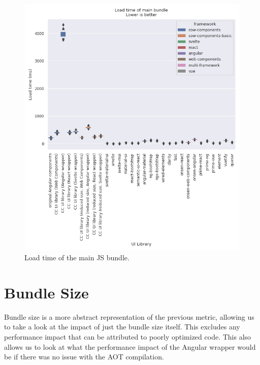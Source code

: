 \begin{figure}[htbp]
  \includegraphics[width=\columnwidth]{plots/load-time-all.png}
  \caption{Load time of the main JS bundle.}
  \label{fig:results:load-time-all}
  \centering
\end{figure}

\section{Bundle Size}
Bundle size is a more abstract representation of the previous metric, allowing us to take a look at the impact of just the bundle size itself. This excludes any performance impact that can be attributed to poorly optimized code. This also allows us to look at what the performance impact of the Angular wrapper would be if there was no issue with the AOT compilation.

